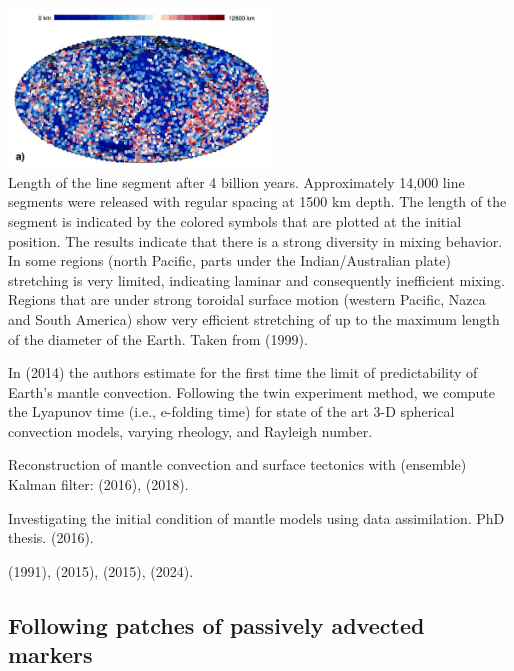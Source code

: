\begin{center}
\includegraphics[width=7cm]{images/mixing/vazh99b}\\
{\captionfont Length
of the line segment after 4 billion years. Approximately 14,000 line segments were released with 
regular spacing at 1500 km depth. The length of the segment is indicated by the colored symbols 
that are plotted at the initial position. The results indicate that there is a strong
diversity in mixing behavior. In some regions (north Pacific, parts under the Indian/Australian plate) 
stretching is very limited, indicating laminar and consequently inefficient mixing. Regions that 
are under strong toroidal surface motion (western Pacific, Nazca and South
America) show very efficient stretching of up to the maximum length of the diameter of the Earth. 
Taken from \textcite{vazh99} (1999).}
\end{center}


In \textcite{becr14} (2014) the authors estimate for the ﬁrst time the limit of predictability of Earth’s
mantle convection. Following the twin experiment method, we compute the Lyapunov time (i.e., e-folding
time) for state of the art 3-D spherical convection models, varying rheology, and Rayleigh number.


Reconstruction of mantle convection and surface tectonics with (ensemble) Kalman filter:
\textcite{bocf16} (2016),
\textcite{bofc18} (2018).

Investigating the initial condition
of mantle models using data assimilation. PhD thesis. \textcite{pric16} (2016).


\Literature

\textcite{pier91} (1991),
\textcite{cobs15} (2015),
\textcite{canl15} (2015),
\textcite{thsf24} (2024).

\subsection{Following patches of passively advected markers}

